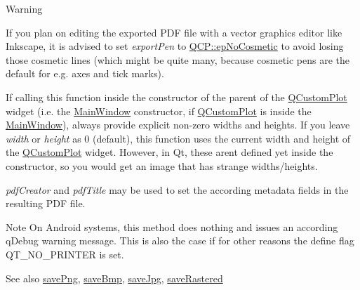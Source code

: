 \begin{DoxyWarning}{Warning}
\begin{DoxyItemize}
\item If you plan on editing the exported P\+DF file with a vector graphics editor like Inkscape, it is advised to set {\itshape export\+Pen} to \hyperlink{namespaceQCP_a17844f19e1019693a953e1eb93536d2faae8fcfaafee234ce18558afef83f6a78}{Q\+C\+P\+::ep\+No\+Cosmetic} to avoid losing those cosmetic lines (which might be quite many, because cosmetic pens are the default for e.\+g. axes and tick marks). \item If calling this function inside the constructor of the parent of the \hyperlink{classQCustomPlot}{Q\+Custom\+Plot} widget (i.\+e. the \hyperlink{classMainWindow}{Main\+Window} constructor, if \hyperlink{classQCustomPlot}{Q\+Custom\+Plot} is inside the \hyperlink{classMainWindow}{Main\+Window}), always provide explicit non-\/zero widths and heights. If you leave {\itshape width} or {\itshape height} as 0 (default), this function uses the current width and height of the \hyperlink{classQCustomPlot}{Q\+Custom\+Plot} widget. However, in Qt, these aren\textquotesingle{}t defined yet inside the constructor, so you would get an image that has strange widths/heights.\end{DoxyItemize}
{\itshape pdf\+Creator} and {\itshape pdf\+Title} may be used to set the according metadata fields in the resulting P\+DF file.
\end{DoxyWarning}
\begin{DoxyNote}{Note}
On Android systems, this method does nothing and issues an according q\+Debug warning message. This is also the case if for other reasons the define flag {\ttfamily Q\+T\+\_\+\+N\+O\+\_\+\+P\+R\+I\+N\+T\+ER} is set.
\end{DoxyNote}
\begin{DoxySeeAlso}{See also}
\hyperlink{classQCustomPlot_ac92cc9256d12f354b40a4be4600b5fb9}{save\+Png}, \hyperlink{classQCustomPlot_ae3a86ed0795670e50afa21759d4fa13d}{save\+Bmp}, \hyperlink{classQCustomPlot_a76f0d278e630a711fa6f48048cfd83e4}{save\+Jpg}, \hyperlink{classQCustomPlot_ad7723ce2edfa270632ef42b03a444352}{save\+Rastered} 
\end{DoxySeeAlso}
\mbox{\label{classQCustomPlot_ac92cc9256d12f354b40a4be4600b5fb9}} 
